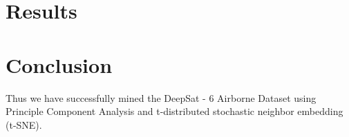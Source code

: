 \documentclass[12pt, letterpaper]{article}
\begin{document}
\newpage
\section{Results}


\newpage

\section{Conclusion}
\hspace*{0.25 in}Thus we have successfully mined the DeepSat - 6 Airborne Dataset using Principle Component Analysis and t-distributed stochastic neighbor embedding (t-SNE).
\end{document}
